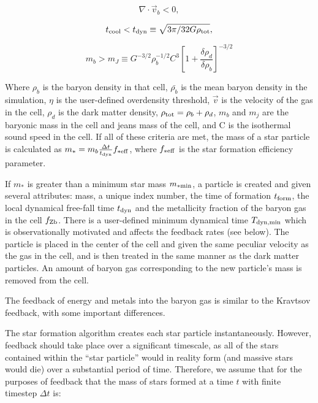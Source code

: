 \begin{equation}
\nabla \cdot \vec{v}_b < 0,
\label{cencont}
\end{equation}

\begin{equation}
t_{\rm cool} < t_{\rm dyn} \equiv \sqrt{3 \pi / 32G \rho_{\rm tot}},
\end{equation}

\begin{equation}
m_{b} > m_{J} \equiv G^{-3/2} \rho_{b}^{-1/2}C^{3}
\left[ 1 + \frac{\delta\rho_{d}}{\delta\rho_{b}} \right]^{-3/2}
\end{equation}

Where $\rho_b$ is the baryon density in that cell, $\bar{\rho_b}$ is
the mean baryon density in the simulation, $\eta$ is the user-defined
overdensity threshold, $\vec{v}$ is the velocity of the gas in the
cell, $\rho_{d}$ is the dark matter density, $\rho_{\rm tot} =
\rho_{b} + \rho_{d}$, $m_{b}$ and $m_{j}$ are the baryonic mass in the
cell and jeans mass of the cell, and C is the isothermal sound speed
in the cell.  If all of these criteria are met, the mass of a star
particle is calculated as \(m_{*} = m_{b} \frac{ \Delta t}{ t_{\rm
    dyn} } f_{\rm *eff} \), where $f_{\rm *eff}$ is the star formation
efficiency parameter.

If $m_{*}$ is greater than a minimum star mass $m_{\rm *min}$, a particle
is created and given several attributes: mass, a unique index number,
the time of formation $t_{\rm form}$, the local dynamical free-fall time
$t_{\rm dyn}$ and the metallicity fraction of the baryon gas in the cell
$f_{\rm Zb}$.  There is a user-defined minimum dynamical time
$T_{\rm dyn,min}$ which is observationally motivated and affects the
feedback rates (see below).  The particle is placed in the center of
the cell and given the same peculiar velocity as the gas in the cell,
and is then treated in the same manner as the dark matter particles.
An amount of baryon gas corresponding to the new particle's mass is
removed from the cell.


The feedback of energy and metals into the baryon gas is similar to
the Kravtsov feedback, with some important differences.  

The star formation algorithm creates each star particle
instantaneously.  However, feedback should take place over a
significant timescale, as all of the stars contained within the ``star
particle'' would in reality form (and massive stars would die) over a
substantial period of time.  Therefore, we assume that for the
purposes of feedback that the mass of stars formed at a time $t$ with
finite timestep $\Delta t$ is:

